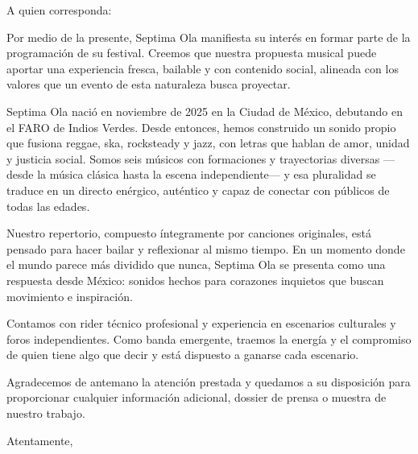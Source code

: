 \documentclass[12pt]{letter}
\date{\large\bfseries Ciudad de México, a \today}
\begin{document}
\begin{letter}{A quien corresponda:}

\opening{}

Por medio de la presente, Septima Ola manifiesta su interés en formar parte de la
programación de su festival. Creemos que nuestra propuesta musical puede aportar una
experiencia fresca, bailable y con contenido social, alineada con los valores que un
evento de esta naturaleza busca proyectar.

Septima Ola nació en noviembre de 2025 en la Ciudad de México, debutando en el FARO de
Indios Verdes. Desde entonces, hemos construido un sonido propio que fusiona reggae,
ska, rocksteady y jazz, con letras que hablan de amor, unidad y justicia social. Somos
seis músicos con formaciones y trayectorias diversas —desde la música clásica hasta la
escena independiente— y esa pluralidad se traduce en un directo enérgico, auténtico y
capaz de conectar con públicos de todas las edades.

Nuestro repertorio, compuesto íntegramente por canciones originales, está pensado para
hacer bailar y reflexionar al mismo tiempo. En un momento donde el mundo parece más
dividido que nunca, Septima Ola se presenta como una respuesta desde México: sonidos
hechos para corazones inquietos que buscan movimiento e inspiración.

Contamos con rider técnico profesional y experiencia en escenarios culturales y foros
independientes. Como banda emergente, traemos la energía y el compromiso de quien tiene
algo que decir y está dispuesto a ganarse cada escenario.

Agradecemos de antemano la atención prestada y quedamos a su disposición para
proporcionar cualquier información adicional, dossier de prensa o muestra de nuestro
trabajo.

\closing{Atentamente,}

\end{letter}
\end{document}
